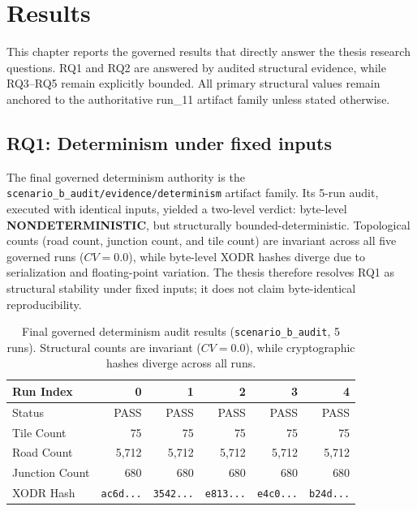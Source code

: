\section{Results}
\label{sec:results}

This chapter reports the governed results that directly answer the thesis research questions. RQ1 and RQ2 are answered by audited structural evidence, while RQ3--RQ5 remain explicitly bounded. All primary structural values remain anchored to the authoritative run\_11 artifact family unless stated otherwise.

\subsection{RQ1: Determinism under fixed inputs}
The final governed determinism authority is the \texttt{scenario\_b\_audit/evidence/determinism} artifact family. Its 5-run audit, executed with identical inputs, yielded a two-level verdict: byte-level \textbf{NONDETERMINISTIC}, but structurally bounded-deterministic. Topological counts (road count, junction count, and tile count) are invariant across all five governed runs ($CV=0.0$), while byte-level XODR hashes diverge due to serialization and floating-point variation. The thesis therefore resolves RQ1 as structural stability under fixed inputs; it does not claim byte-identical reproducibility.

\begin{table}[htbp]
\centering
\begin{tabular}{lrrrrr}
\hline
Run Index & 0 & 1 & 2 & 3 & 4 \\
\hline
Status & PASS & PASS & PASS & PASS & PASS \\
Tile Count & 75 & 75 & 75 & 75 & 75 \\
Road Count & 5,712 & 5,712 & 5,712 & 5,712 & 5,712 \\
Junction Count & 680 & 680 & 680 & 680 & 680 \\
XODR Hash & \texttt{ac6d...} & \texttt{3542...} & \texttt{e813...} & \texttt{e4c0...} & \texttt{b24d...} \\
\hline
\end{tabular}
\caption[Governed determinism audit results (\texttt{scenario\_b\_audit}, 5 runs): topological counts invariant, hashes diverge.]{Final governed determinism audit results (\texttt{scenario\_b\_audit}, 5 runs). Structural counts are invariant ($CV=0.0$), while cryptographic hashes diverge across all runs.}
\label{tab:determinism_results}
\end{table}

